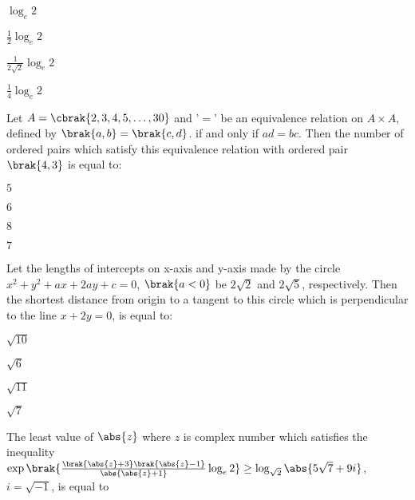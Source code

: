 \hfill{}
\begin{enumerate}
\begin{multicols}{4}
\item $\log_e{2}$
\item $\frac{1}{2}\log_e{2}$
\item $\frac{1}{2\sqrt{2}}\log_e{2}$
\item $\frac{1}{4}\log_e{2}$
\end{multicols}
\end{enumerate}

\item Let $A=\cbrak{2,3,4,5,\dots,30}$ and '$=$' be an equivalence relation on $A \times A$, defined by $\brak{a,b}=\brak{c,d}$. if and only if $ad=bc$. Then the number of ordered pairs which satisfy this equivalence relation with ordered pair $\brak{4,3}$ is equal to:

\hfill{}
\begin{enumerate}
\begin{multicols}{4}
\item $5$
\item $6$
\item $8$
\item $7$
\end{multicols}
\end{enumerate}

\item Let the lengths of intercepts on x-axis and y-axis made by the circle $x^2+y^2+ax+2ay+c=0$, $\brak{a<0}$ be $2\sqrt{2}$ and $2\sqrt{5}$, respectively. Then the shortest distance from origin to a tangent to this circle which is perpendicular to the line $x+2y=0$, is equal to:

\hfill{}
\begin{enumerate}
\begin{multicols}{4}
\item $\sqrt{10}$
\item $\sqrt{6}$
\item $\sqrt{11}$
\item $\sqrt{7}$
\end{multicols}
\end{enumerate}

\item The least value of $\abs{z}$ where $z$ is complex number which satisfies the inequality $\exp\brak{\frac{\brak{\abs{z}+3}\brak{\abs{z}-1}}{\abs{{\abs{z}+1}}}\log_e{2}}\ge\log_{\sqrt{2}}{\abs{5\sqrt{7}+9i}}$, $i=\sqrt{-1}$, is equal to


